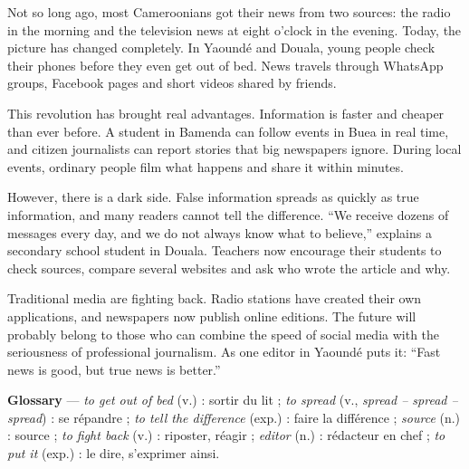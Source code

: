 \documentclass[11pt]{article}
\begin{document}
\begin{textebox}
Not so long ago, most Cameroonians got their news from two sources: the radio in the morning and the television news at eight o'clock in the evening. Today, the picture has changed completely. In Yaoundé and Douala, young people check their phones before they even get out of bed. News travels through WhatsApp groups, Facebook pages and short videos shared by friends.

This revolution has brought real advantages. Information is faster and cheaper than ever before. A student in Bamenda can follow events in Buea in real time, and citizen journalists can report stories that big newspapers ignore. During local events, ordinary people film what happens and share it within minutes.

However, there is a dark side. False information spreads as quickly as true information, and many readers cannot tell the difference. “We receive dozens of messages every day, and we do not always know what to believe,” explains a secondary school student in Douala. Teachers now encourage their students to check sources, compare several websites and ask who wrote the article and why.

Traditional media are fighting back. Radio stations have created their own applications, and newspapers now publish online editions. The future will probably belong to those who can combine the speed of social media with the seriousness of professional journalism. As one editor in Yaoundé puts it: “Fast news is good, but true news is better.”

\textbf{Glossary} — \emph{to get out of bed} (v.) : sortir du lit ; \emph{to spread} (v., \emph{spread -- spread -- spread}) : se répandre ; \emph{to tell the difference} (exp.) : faire la différence ; \emph{source} (n.) : source ; \emph{to fight back} (v.) : riposter, réagir ; \emph{editor} (n.) : rédacteur en chef ; \emph{to put it} (exp.) : le dire, s'exprimer ainsi.
\end{textebox}
\end{document}

